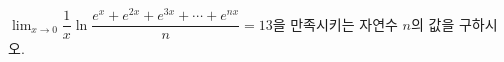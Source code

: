 $\displaystyle\lim_{x\to 0}\dfrac{1}{x}\ln\dfrac{e^x+e^{2x}+e^{3x}+\cdots+e^{nx}}{n}=13$을 만족시키는 자연수 $n$의 값을 구하시오.
